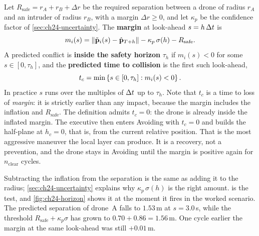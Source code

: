 \begin{definition}
\label{def:ch24-inside}
Let $R_{\mathrm{safe}} = r_A + r_B + \Delta r$ be the required separation
between a drone of radius $r_A$ and an intruder of radius $r_B$, with a
margin $\Delta r \ge 0$, and let $\kappa_p$ be the confidence factor of
\cref{sec:ch24-uncertainty}. The \textbf{margin}
at look-ahead $s = h\,\Delta t$ is
\begin{equation}
  m_i(s) = \left\lVert \tilde{\mathbf{p}}_i(s) - \hat{\mathbf{p}}_{T+h} \right\rVert - \kappa_p\,\sigma(h) - R_{\mathrm{safe}}.
  \label{eq:ch24-margin}
\end{equation}
A predicted conflict is \textbf{inside the safety horizon} $\tau_h$ if
$m_i(s) < 0$ for some $s \in [0, \tau_h]$, and the \textbf{predicted time to
collision} is the first such look-ahead,
\begin{equation}
  t_c = \min\left\{ s \in [0, \tau_h] : m_i(s) < 0 \right\}.
  \label{eq:ch24-tc}
\end{equation}
In practice $s$ runs over the multiples of $\Delta t$ up to $\tau_h$. Note that
$t_c$ is a time to loss of \emph{margin}: it is strictly earlier than any
impact, because the margin includes the inflation and $R_{\mathrm{safe}}$.
The definition admits $t_c = 0$: the drone is already inside the inflated
margin. The executive then enters Avoiding with $t_c = 0$ and builds the
\orca half-plane at $h_c = 0$, that is, from the current relative
position. That is the most aggressive maneuver the local layer can
produce. It is a recovery, not a prevention, and the drone stays in
Avoiding until the margin is positive again for $n_{\mathrm{clear}}$
cycles.
\end{definition}

Subtracting the inflation from the separation is the same as adding it to
the radius; \cref{sec:ch24-uncertainty} explains why $\kappa_p\,\sigma(h)$
is the right amount.  is the test, and
\cref{fig:ch24-horizon} shows it at the moment it fires in the worked
scenario. The predicted separation of drone~A falls to $1.53$\,m at
$s = 3.0$\,s, while the threshold $R_{\mathrm{safe}} + \kappa_p\sigma$ has
grown to $0.70 + 0.86 = 1.56$\,m. One cycle earlier the margin at the same
look-ahead was still $+0.01$\,m.

